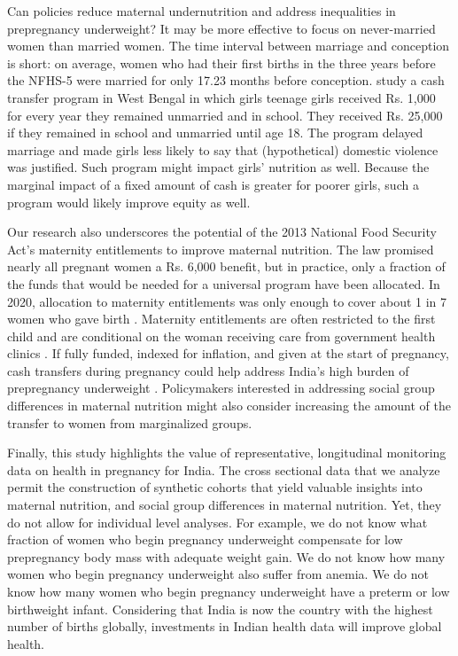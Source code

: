 Can policies reduce maternal undernutrition and address inequalities in prepregnancy underweight?  It may be more effective to focus on never-married women than married women.  The time interval between marriage and conception is short: on average, women who had their first births in the three years before the NFHS-5 were married for only 17.23 months before conception.  \cite{banerjee2024persistent} study a cash transfer program in West Bengal in which girls teenage girls received Rs. 1,000 for every year they remained unmarried and in school. They received Rs. 25,000 if they remained in school and unmarried until age 18.  The program delayed marriage and made girls less likely to say that (hypothetical) domestic violence was justified.  Such program might impact girls' nutrition as well.  Because the marginal impact of a fixed amount of cash is greater for poorer girls, such a program would likely improve equity as well.  

Our research also underscores the potential of the 2013 National Food Security Act's maternity entitlements to improve maternal nutrition.  The law promised nearly all pregnant women a Rs. 6,000 benefit, but in practice, only a fraction of the funds that would be needed for a universal program have been allocated.  In 2020, allocation to maternity entitlements was only enough to cover about 1 in 7 women who gave birth \cite{dreze2021derailed}.  Maternity entitlements are often restricted to the first child and are conditional on the woman receiving care from government health clinics \citep{kalra2020birth}.  If fully funded, indexed for inflation, and given at the start of pregnancy, cash transfers during pregnancy could help address India's high burden of prepregnancy underweight \citep{coffey2016underweight}. Policymakers interested in addressing social group differences in maternal nutrition might also consider increasing the amount of the transfer to women from marginalized groups.

Finally, this study highlights the value of representative, longitudinal monitoring data on health in pregnancy for India.  The cross sectional data that we analyze permit the construction of synthetic cohorts that yield valuable insights into maternal nutrition, and social group differences in maternal nutrition.  Yet, they do not allow for individual level analyses.  For example, we do not know what fraction of women who begin pregnancy underweight compensate for low prepregnancy body mass with adequate weight gain.  We do not know how many women who begin pregnancy underweight also suffer from anemia.  We do not know how many women who begin pregnancy underweight have a preterm or low birthweight infant.  Considering that India is now the country with the highest number of births globally, investments in Indian health data will improve global health.